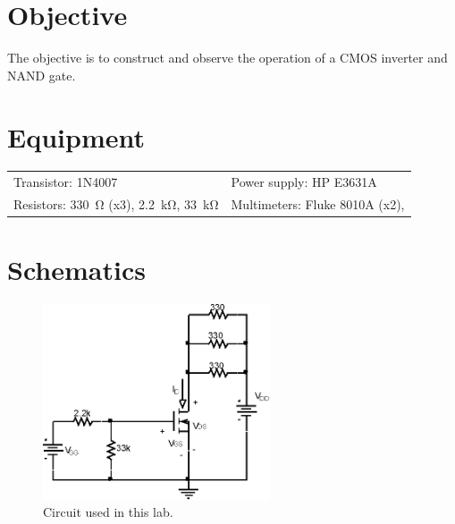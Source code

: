 

\section{Objective}
\label{sec:objective}

The objective is to construct and observe the operation of a CMOS inverter and NAND gate.

\section{Equipment}
\label{sec:equipment}

\begin{tabular}{ll}
  \centering
  Transistor: 1N4007                          & Power supply: HP E3631A       \\
  Resistors: \SI{330}{\ohm} (x3), \SI{2.2}{\kilo\ohm}, \SI{33}{\kilo\ohm}               & Multimeters: Fluke 8010A (x2),  \\
\end{tabular}

 \section{Schematics}
 \label{sec:schematics}

 \begin{figure}[hbtp]
   \centering
   \includegraphics[width=0.6\textwidth]{circuit}
   \caption{\label{fig:circuit} Circuit used in this lab.}
 \end{figure}

